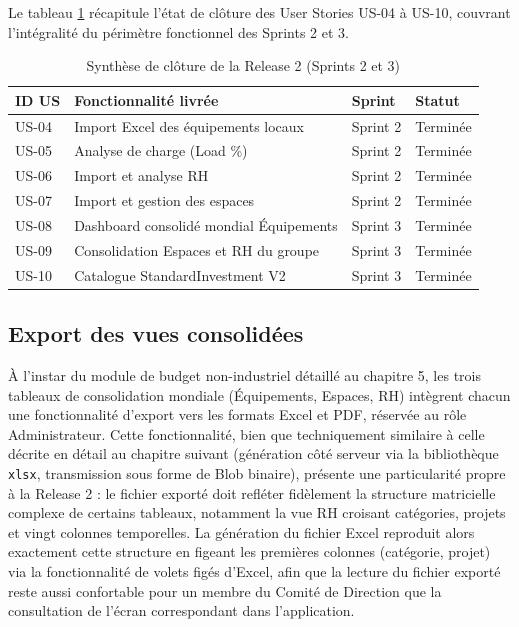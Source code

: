 Le tableau \ref{tab:synthese_release2} récapitule l'état de clôture des User Stories US-04 à US-10, couvrant l'intégralité du périmètre fonctionnel des Sprints 2 et 3.

\begin{table}[h]
\centering
\begin{tabular}{|p{1.6cm}|p{7cm}|p{4.5cm}|p{1.8cm}|}
\hline
\textbf{ID US} & \textbf{Fonctionnalité livrée} & \textbf{Sprint} & \textbf{Statut} \\ \hline
US-04 & Import Excel des équipements locaux & Sprint 2 & Terminée \\ \hline
US-05 & Analyse de charge (Load \%) & Sprint 2 & Terminée \\ \hline
US-06 & Import et analyse RH & Sprint 2 & Terminée \\ \hline
US-07 & Import et gestion des espaces & Sprint 2 & Terminée \\ \hline
US-08 & Dashboard consolidé mondial Équipements & Sprint 3 & Terminée \\ \hline
US-09 & Consolidation Espaces et RH du groupe & Sprint 3 & Terminée \\ \hline
US-10 & Catalogue StandardInvestment V2 & Sprint 3 & Terminée \\ \hline
\end{tabular}
\caption{Synthèse de clôture de la Release 2 (Sprints 2 et 3)}
\label{tab:synthese_release2}
\end{table}

\subsection{Export des vues consolidées}
À l'instar du module de budget non-industriel détaillé au chapitre 5, les trois tableaux de consolidation mondiale (Équipements, Espaces, RH) intègrent chacun une fonctionnalité d'export vers les formats Excel et PDF, réservée au rôle Administrateur. Cette fonctionnalité, bien que techniquement similaire à celle décrite en détail au chapitre suivant (génération côté serveur via la bibliothèque \texttt{xlsx}, transmission sous forme de Blob binaire), présente une particularité propre à la Release 2 : le fichier exporté doit refléter fidèlement la structure matricielle complexe de certains tableaux, notamment la vue RH croisant catégories, projets et vingt colonnes temporelles. La génération du fichier Excel reproduit alors exactement cette structure en figeant les premières colonnes (catégorie, projet) via la fonctionnalité de volets figés d'Excel, afin que la lecture du fichier exporté reste aussi confortable pour un membre du Comité de Direction que la consultation de l'écran correspondant dans l'application.

